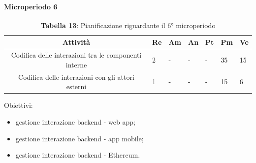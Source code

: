 \paragraph{Microperiodo 6}
\begin{table}[H]
	\centering
	\renewcommand{\arraystretch}{1.5}
	\begin{tabular}{|c|p{10mm}|p{8mm}|p{8mm}|p{8mm}|p{8mm}|p{8mm}|}
		\hline
		\rowcolor{lighter-grayer}
		\textbf{Attività}                         & \textbf{Re} & \textbf{Am} & \textbf{An} & \textbf{Pt} & \textbf{Pm} & \textbf{Ve} \\ \hline
		
		Codifica delle interazioni tra le componenti interne & 2                                &       -                           &        -                          &             -                     & 35                               & 15                               \\ \hline
		Codifica delle interazioni con gli attori esterni    & 1                                &      -                            &         -                         &                -                  & 15                               & 6                                \\ \hline
		
	\end{tabular}
	\caption*{\textbf{Tabella 13}: Pianificazione riguardante il 6° microperiodo\\}
\end{table}

Obiettivi:
\begin{itemize}
	\item gestione interazione backend - web app;
	\item gestione interazione backend - app mobile;
	\item gestione interazione backend - Ethereum.
\end{itemize}


